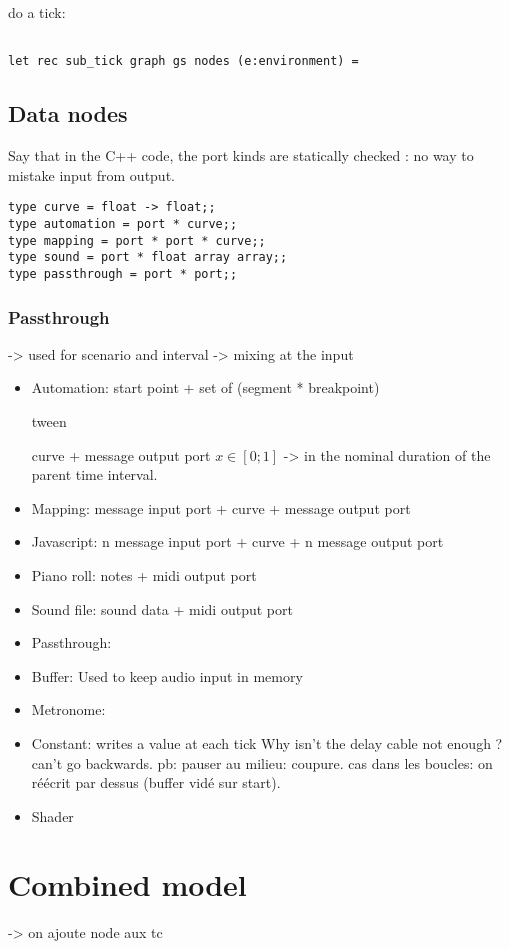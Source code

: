\documentclass[applsci,article,submit,moreauthors,pdftex,10pt,a4paper]{mdpi}
\begin{document}
do a tick: 

\begin{lstlisting}

let rec sub_tick graph gs nodes (e:environment) =
\end{lstlisting}


\subsection{Data nodes}
Say that in the C++ code, the port kinds are statically checked : no way to mistake input from output.
\begin{lstlisting}
type curve = float -> float;;
type automation = port * curve;;
type mapping = port * port * curve;;
type sound = port * float array array;;
type passthrough = port * port;;
\end{lstlisting}
\subsubsection{Passthrough}
-> used for scenario and interval
-> mixing at the input

\begin{itemize}
\item Automation: 
start point + set of (segment * breakpoint)

tween

curve + message output port
$x\in[0;1]$ -> in the nominal duration of the parent time interval.

\item Mapping: message input port + curve + message output port
\item Javascript:  n message input port + curve + n message output port
\item Piano roll:  notes + midi output port
\item Sound file: sound data + midi output port
\item Passthrough:
\item Buffer: Used to keep audio input in memory
\item Metronome: 
\item Constant: writes a value at each tick
Why isn't the delay cable not enough ? can't go backwards. 
pb: pauser au milieu: coupure. cas dans les boucles: on réécrit par dessus (buffer vidé sur start).
\item Shader
\end{itemize}


\section{Combined model}
-> on ajoute node aux tc
\end{document}
